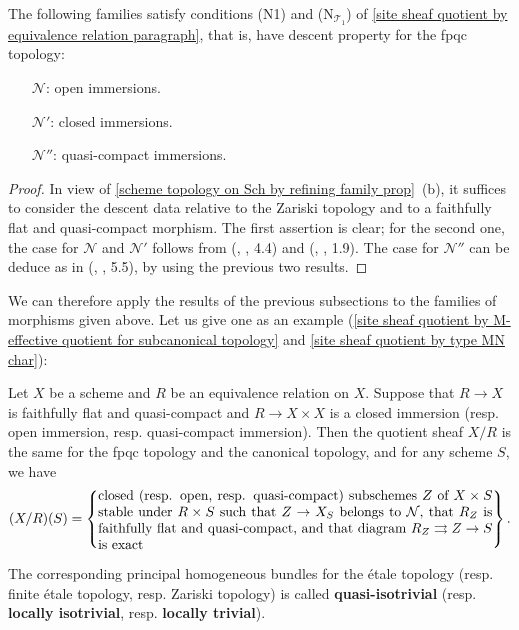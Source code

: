 \begin{proposition}\label{scheme morphism descent by fpqc eg}
The following families satisfy conditions (N1) and ($\text{N}_{\mathcal{T}_1}$) of \ref{site sheaf quotient by equivalence relation paragraph}, that is, have descent property for the fpqc topology:
\begin{enumerate}[leftmargin=35pt]
    \item[$\mathcal{N}$:] open immersions.
    \item[$\mathcal{N}'$:] closed immersions.
    \item[$\mathcal{N}''$:] quasi-compact immersions.
\end{enumerate}
\end{proposition}
\begin{proof}
In view of \cref{scheme topology on Sch by refining family prop}~(b), it suffices to consider the descent data relative to the Zariski topology and to a faithfully flat and quasi-compact morphism. The first assertion is clear; for the second one, the case for $\mathcal{N}$ and $\mathcal{N}'$ follows from (\cite{SGA1}, , 4.4) and (\cite{SGA1}, , 1.9). The case for $\mathcal{N}''$ can be deduce as in (\cite{SGA1}, , 5.5), by using the previous two results.
\end{proof}

We can therefore apply the results of the previous subsections to the families of morphisms given above. Let us give one as an example (\cref{site sheaf quotient by M-effective quotient for subcanonical topology} and \cref{site sheaf quotient by type MN char}):

\begin{corollary}\label{scheme quotient by fpqc equivalence relation prop}
Let $X$ be a scheme and $R$ be an equivalence relation on $X$. Suppose that $R\to X$ is faithfully flat and quasi-compact and $R\to X\times X$ is a closed immersion (resp. open immersion, resp. quasi-compact immersion). Then the quotient sheaf $X/R$ is the same for the fpqc topology and the canonical topology, and for any scheme $S$, we have
\[(X/R)(S)=\left\{\parbox{4in}{%
closed (resp. open, resp. quasi-compact) subschemes $Z$ of $X\times S$ stable under $R\times S$ such that $Z\to X_S$ belongs to $\mathcal{N}$, that $R_Z$ is faithfully flat and quasi-compact, and that diagram $R_Z\rightrightarrows Z\to S$ is exact%
}\right\}.\]
\end{corollary}

\begin{remark}
The corresponding principal homogeneous bundles for the \'etale topology (resp. finite \'etale topology, resp. Zariski topology) is called \textbf{quasi-isotrivial} (resp. \textbf{locally isotrivial}, resp. \textbf{locally trivial}).
\end{remark}

